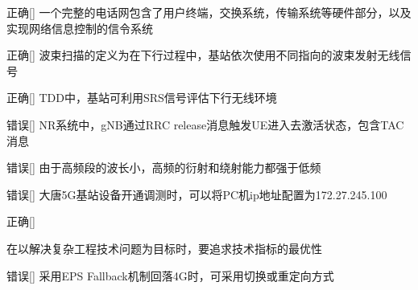 \begin{choice}{\;正确\;}[]
    一个完整的电话网包含了用户终端，交换系统，传输系统等硬件部分，以及实现网络信息控制的信令系统
\end{choice}

\begin{choice}{\;正确\;}[]
    波束扫描的定义为在下行过程中，基站依次使用不同指向的波束发射无线信号
\end{choice}

\begin{choice}{\;正确\;}[]
    TDD中，基站可利用SRS信号评估下行无线环境
\end{choice}

\begin{choice}{\;错误\;}[]
    NR系统中，gNB通过RRC release消息触发UE进入去激活状态，包含TAC消息

\end{choice}


\begin{choice}{\;错误\;}[]
    由于高频段的波长小，高频的衍射和绕射能力都强于低频

\end{choice}

\begin{choice}{\;错误\;}[]
    大唐5G基站设备开通调测时，可以将PC机ip地址配置为172.27.245.100

\end{choice}

\begin{choice}{\;正确\;}[]

    在以解决复杂工程技术问题为目标时，要追求技术指标的最优性
\end{choice}


\begin{choice}{\;错误\;}[]
    采用EPS Fallback机制回落4G时，可采用切换或重定向方式

\end{choice}











